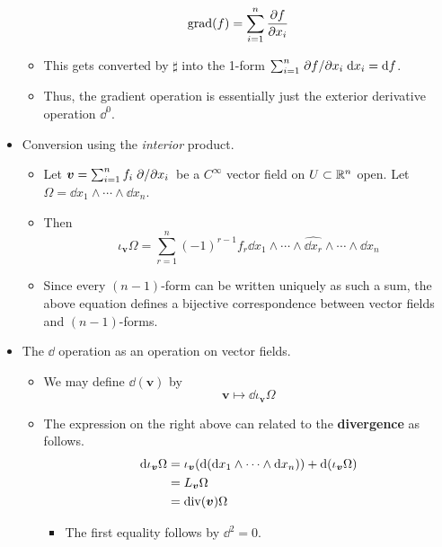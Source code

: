 \documentclass[../notes.tex]{subfiles}
\begin{document}
\begin{itemize}
    \begin{equation*}
        \operatorname{grad}(f) = \sum_{i=1}^n\pdv{f}{x_i}
    \end{equation*}
    \begin{itemize}
        \item This gets converted by $\sharp$ into the 1-form $\sum_{i=1}^n\pdv*{f}{x_i}\dd{x_i}=\dd{f}$.
        \item Thus, the gradient operation is essentially just the exterior derivative operation $\dd^0$.
    \end{itemize}
    \item Conversion using the \emph{interior} product.
    \begin{itemize}
        \item Let $\bm{v}=\sum_{i=1}^nf_i\pdv*{x_i}$ be a $C^\infty$ vector field on $U\subset\mathbb{R}^n$ open. Let $\Omega=\dd{x_1}\wedge\cdots\wedge\dd{x_n}$.
        \item Then
        \begin{equation*}
            \iota_{\bm{v}}\Omega = \sum_{r=1}^n(-1)^{r-1}f_r\dd{x_1}\wedge\cdots\wedge\widehat{\dd{x_r}}\wedge\cdots\wedge\dd{x_n}
        \end{equation*}
        \item Since every $(n-1)$-form can be written uniquely as such a sum, the above equation defines a bijective correspondence between vector fields and $(n-1)$-forms.
    \end{itemize}
    \item The $\dd$ operation as an operation on vector fields.
    \begin{itemize}
        \item We may define $\dd(\bm{v})$ by
        \begin{equation*}
            \bm{v} \mapsto \dd\iota_{\bm{v}}\Omega
        \end{equation*}
        \item The expression on the right above can related to the \textbf{divergence} as follows.
        \begin{align*}
            \dd\iota_{\bm{v}}\Omega &= \iota_{\bm{v}}(\dd(\dd{x_1}\wedge\cdots\wedge\dd{x_n}))+\dd(\iota_{\bm{v}}\Omega)\\
            &= L_{\bm{v}}\Omega\\
            &= \operatorname{div}(\bm{v})\Omega
        \end{align*}
        \begin{itemize}
            \item The first equality follows by $\dd^2=0$.

\end{itemize}
\end{itemize}
\end{itemize}
\end{document}
